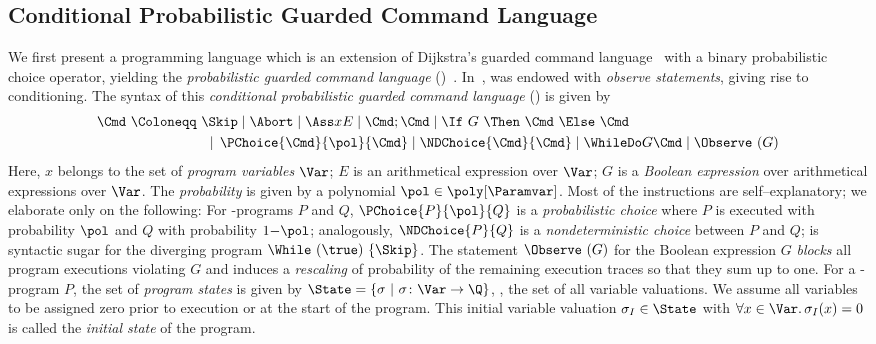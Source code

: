 \subsection{Conditional Probabilistic Guarded Command Language}

We first present a programming language which is an extension of Dijkstra's guarded command language~\cite{Dijkstra} with a binary probabilistic choice operator, yielding the 
\emph{probabilistic guarded command language} (\pGCL)~\cite{McIver:2004}. In~\cite{jansen-et-al-mfps-2015}, \pGCL was endowed with \emph{observe statements}, giving rise to conditioning. The syntax of this \emph{conditional probabilistic guarded command language} (\cpGCL) is given by
\begin{align*}
\Cmd ~\Coloneqq~  &\Skip \mid \Abort \mid \Ass x E \mid \Cmd;\Cmd \mid \If\ G\ \Then\ {\Cmd }\ \Else\ {\Cmd } \\ 
   &{}~\mid  \, \PChoice {\Cmd} {\pol} {\Cmd} \mid
\NDChoice {\Cmd}{\Cmd} \mid \WhileDo G \Cmd \mid \Observe~(G)
\end{align*}
Here, $x$ belongs to the set of \emph{program variables} $\Var$; $E$ is an arithmetical expression over $\Var$; $G$ is a \emph{Boolean expression} over arithmetical expressions over $\Var$. The \emph{probability} is given by a polynomial $\pol \in \poly[\Paramvar]$.
 Most of the \cpGCL instructions are self--explanatory; we elaborate only on the following: For \cpGCL-programs $P$ and $Q$, $\PChoice{P}{\pol}{Q}$ is a \emph{probabilistic choice} where $P$ is executed with probability $\pol$ and $Q$ with probability $1{-}\pol$; analogously, $\NDChoice{P}{Q}$ is a \emph{nondeterministic choice} between $P$ and $Q$;  \Abort is syntactic sugar for the diverging program $\While\ (\true)\ \{\Skip\}$. The statement $\Observe~(G)$ for the Boolean expression $G$ \emph{blocks} all program executions violating $G$ and induces a \emph{rescaling} of probability of the
remaining execution traces so that they sum up to one. 
For a \cpGCL-program $P$, the set of \emph{program states} is given by $\State = \{\sigma ~|~ \sigma \colon \Var \to \Q\}$, 
\ie, the set of all  variable valuations. We assume all variables to be assigned zero prior to execution or at the start of the program. This initial variable valuation $\sigma_I\in\State$ with $\forall x \in \Var.\, \sigma_I(x) = 0$ is called the \emph{initial state} of the program. 
